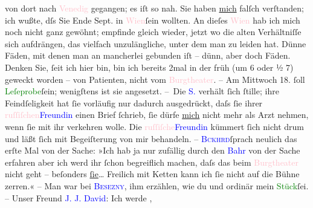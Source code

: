                von dort nach \textcolor{pink}{Venedig}{}\ledrightnote{\textcolor{pink}{Venedig}} gegangen; es iſt so nah. Sie
               haben \uline{mich} falſch verſtanden; ich wußte, dſs Sie Ende
               Sept. in \textcolor{pink}{Wien}{}\ledrightnote{\textcolor{pink}{Wien}}{ }ſein wollten. An dieſes \textcolor{pink}{Wien}{}\ledrightnote{\textcolor{pink}{Wien}} hab ich mich noch nicht ganz gewöhnt; empfinde gleich wieder, jetzt wo
               die alten Verhältniſſe sich aufdrängen, das vielfach unzulängliche, unter dem man zu
               leiden hat. Dünne Fäden, mit denen {\pb}man an mancherlei
               gebunden iſt – dünn, aber doch Fäden. Denken Sie, ſeit ich hier bin, bin ich bereits
               2mal in der früh \introOben{}(um 6 oder ½ 7)\introOben{} geweckt worden – von
               Patienten, nicht vom \textcolor{pink}{Burgtheater}{}\ledrightnote{\textcolor{pink}{Burgtheater}}. – Am Mittwoch 18.
               ſoll \textcolor{green}{Leſeprobe}{}ſein; wenigſtens ist sie angesetzt.\pend
           \pstart
           – Die \textcolor{blue}{S.}{}\ledrightnote{\textcolor{blue}{Adele Sandrock}} verhält ſich ſtille; ihre Feindſeligkeit
               hat ſie vorläufig nur dadurch ausgedrückt, daſs ſie ihrer \textcolor{pink}{ruſſiſchen}{}\ledrightnote{\textcolor{pink}{Russland}}{ }\textcolor{blue}{Freundin}{} einen Brief ſchrieb,
               ſie dürfe \uline{mich} nicht mehr als Arzt nehmen, wenn ſie
               mit ihr verkehren wolle. Die \textcolor{pink}{ruſſiſche}{}\ledrightnote{\textcolor{pink}{Russland}}{ }\textcolor{blue}{Freundin}{} kümmert ſich nicht
               drum {\pb}und läßt ſich mit Begeiſterung von mir
               behandeln. – \textcolor{blue}{\textsc{Bckhrd}}{}\ledrightnote{\textcolor{blue}{Max Eugen Burckhard}}{ }ſprach neulich das erſte Mal von der Sache: »Ich
               hab ja nur zufällig durch den \textcolor{blue}{Bahr}{}\ledrightnote{\textcolor{blue}{Hermann Bahr}} von der Sache
               erfahren {\dotstwo} aber ich werd ihr ſchon begreiflich machen,
               daſs das beim \textcolor{pink}{Burgtheater}{}\ledrightnote{\textcolor{pink}{Burgtheater}} nicht geht – beſonders \uline{ſie}{\dots} Freilich mit Ketten kann ich ſie nicht auf die Bühne
               zerren.« – Man war bei \textcolor{blue}{\textsc{Besezny}}{}\ledrightnote{\textcolor{blue}{Josef von Bezecný}}, ihm erzählen, wie du{\geminationm} und ordinär mein \textcolor{green}{Stück}{}ſei. – Unser Freund \textcolor{blue}{J. J. David}{}\ledrightnote{\textcolor{blue}{Jakob Julius David}}: Ich werde \label{K_L00483_1v}\label{K_L00483_1h},
